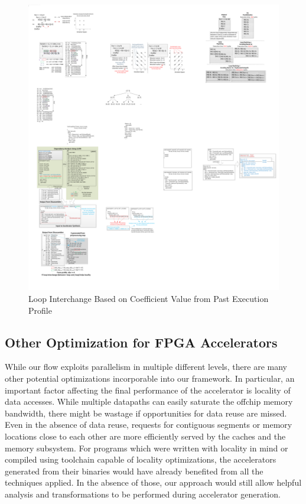 \begin{figure}[htp]
\begin{center}
\includegraphics[width=0.8\linewidth]{chap6fig/loopInterchange.pdf}
\caption{Loop Interchange Based on Coefficient Value from Past Execution Profile 
\label{localityopt}}
\end{center}
\end{figure}

\subsection{Other Optimization for FPGA Accelerators}
While our flow exploits parallelism in 
multiple different levels, there are many other potential optimizations incorporable into our framework.  
In particular, an important factor affecting the final performance of the 
accelerator is locality of data accesses. While multiple datapaths can
easily saturate the offchip memory bandwidth, there might be wastage if opportunities for data reuse are missed. 
Even in the absence of data reuse, requests for 
contiguous segments or memory locations close to each other are more efficiently served by the caches and the memory subsystem. For programs which were written with locality in mind or compiled using toolchain capable of locality optimizations, the accelerators generated from their binaries would have already benefited  from all the techniques applied. 
In the absence of those, our approach would still allow helpful analysis and transformations to be performed during accelerator generation. 

